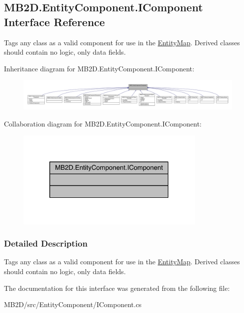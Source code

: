 \hypertarget{interface_m_b2_d_1_1_entity_component_1_1_i_component}{}\subsection{M\+B2\+D.\+Entity\+Component.\+I\+Component Interface Reference}
\label{interface_m_b2_d_1_1_entity_component_1_1_i_component}


Tags any class as a valid component for use in the \hyperlink{class_m_b2_d_1_1_entity_component_1_1_entity_map}{Entity\+Map}. Derived classes should contain no logic, only data fields.  




Inheritance diagram for M\+B2\+D.\+Entity\+Component.\+I\+Component\+:
\nopagebreak
\begin{figure}[H]
\begin{center}
\leavevmode
\includegraphics[width=350pt]{interface_m_b2_d_1_1_entity_component_1_1_i_component__inherit__graph}
\end{center}
\end{figure}


Collaboration diagram for M\+B2\+D.\+Entity\+Component.\+I\+Component\+:
\nopagebreak
\begin{figure}[H]
\begin{center}
\leavevmode
\includegraphics[width=261pt]{interface_m_b2_d_1_1_entity_component_1_1_i_component__coll__graph}
\end{center}
\end{figure}


\subsubsection{Detailed Description}
Tags any class as a valid component for use in the \hyperlink{class_m_b2_d_1_1_entity_component_1_1_entity_map}{Entity\+Map}. Derived classes should contain no logic, only data fields. 



The documentation for this interface was generated from the following file\+:\begin{DoxyCompactItemize}
\item 
M\+B2\+D/src/\+Entity\+Component/I\+Component.\+cs\end{DoxyCompactItemize}
